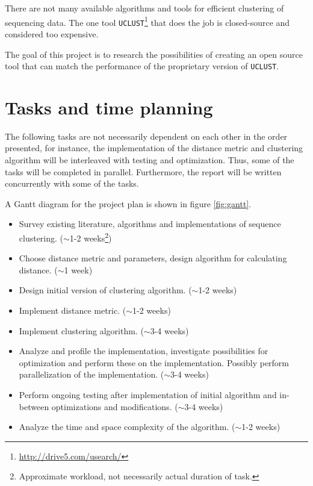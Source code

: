 \documentclass[11pt,a4paper]{article}
\begin{document}
There are not many available algorithms and tools for efficient clustering of
sequencing data. The one tool
\texttt{UCLUST}\footnote{\url{http://drive5.com/usearch/}} that does the job is
closed-source and considered too expensive.

The goal of this project is to research the possibilities of creating an open source tool that can match the performance of the proprietary version of
\texttt{UCLUST}.


\section{Tasks and time planning}
The following tasks are not necessarily dependent on each other in the order
presented, for instance, the implementation of the distance metric and
clustering algorithm will be interleaved with testing and optimization.
Thus, some of the tasks will be completed in parallel. Furthermore, the report
will be written concurrently with some of the tasks.

A Gantt diagram for the project plan is shown in figure \ref{fig:gantt}.

\begin{itemize}
  \item Survey existing literature, algorithms and implementations of sequence
    clustering. ($\sim$1-2 weeks\footnote{Approximate workload, not necessarily
    actual duration of task.})

  \item Choose distance metric and parameters, design algorithm for calculating
    distance. ($\sim$1 week)

  \item Design initial version of clustering algorithm. ($\sim$1-2 weeks)

  \item Implement distance metric. ($\sim$1-2 weeks)

  \item Implement clustering algorithm. ($\sim$3-4 weeks)

  \item Analyze and profile the implementation, investigate possibilities for
    optimization and perform these on the implementation. Possibly perform
    parallelization of the implementation. ($\sim$3-4 weeks)

  \item Perform ongoing testing after implementation of initial algorithm and
    in-between optimizations and modifications. ($\sim$3-4 weeks)

  \item Analyze the time and space complexity of the algorithm. ($\sim$1-2
    weeks)
\end{itemize}
\end{document}
